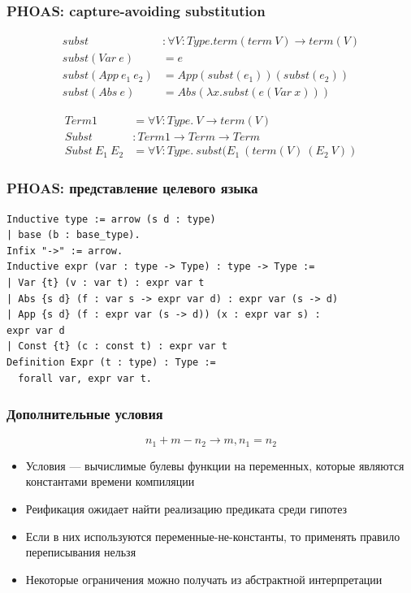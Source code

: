 \documentclass[xcolor=table]{beamer}
\begin{document}
\begin{frame}[fragile]
  \transwipe[direction=90]
  \frametitle{PHOAS: capture-avoiding substitution}
\begin{align*}
subst &: \forall V : Type. term(term \ V) \rightarrow term(V) \\
subst (Var \ e) &= e \\
subst (App \ e_1 \ e_2) &= App (subst(e_1)) (subst(e_2)) \\
subst (Abs \ e) &= Abs (\lambda x. subst(e (Var \ x)))
\end{align*}

\begin{align*}
  Term1 &= \forall V : Type . \ V \rightarrow term(V) \\
  Subst &: Term1 \rightarrow Term \rightarrow Term \\
  Subst \ E_1 \ E_2 &= \forall V:Type . \ subst(E_1\ (term(V) \ (E_2\ V))
\end{align*}
\end{frame}

\begin{frame}[fragile]
  \transwipe[direction=90]
  \frametitle{PHOAS: представление целевого языка}
\begin{lstlisting}[basicstyle=\footnotesize]
Inductive type := arrow (s d : type)
| base (b : base_type).
Infix "->" := arrow.
Inductive expr (var : type -> Type) : type -> Type :=
| Var {t} (v : var t) : expr var t
| Abs {s d} (f : var s -> expr var d) : expr var (s -> d)
| App {s d} (f : expr var (s -> d)) (x : expr var s) :
expr var d
| Const {t} (c : const t) : expr var t
Definition Expr (t : type) : Type :=
  forall var, expr var t.
\end{lstlisting}
\end{frame}

\begin{frame}[fragile]
  \transwipe[direction=90]
  \frametitle{Дополнительные условия}
  \[n_1 + m - n_2 \rightarrow m, n_1 = n_2\]

  \begin{itemize}
    \item Условия --- вычислимые булевы функции на переменных, которые являются константами времени компиляции
    \item Реификация ожидает найти реализацию предиката среди гипотез
    \item Если в них используются переменные-не-константы, то применять правило переписывания нельзя
    \bigskip
    \item Некоторые ограничения можно получать из абстрактной интерпретации
  \end{itemize}
\end{frame}
\end{document}
